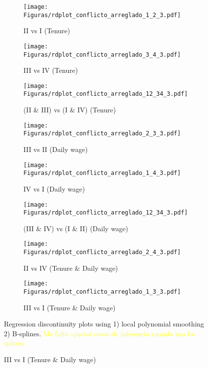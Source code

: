\documentclass[oneside,11pt]{article}
\begin{document}


\begin{figure}[H]
     \caption{RD plots (Calculator + letter treatment)}
    \label{rd_t3}
\begin{center}
\begin{subfigure}{0.31\textwidth}
\caption{II vs I (Tenure)}
        \texttt{[image: Figuras/rdplot\_conflicto\_arreglado\_1\_2\_3.pdf]}
    \end{subfigure}
    \begin{subfigure}{0.31\textwidth}
\caption{III vs IV (Tenure)}
        \texttt{[image: Figuras/rdplot\_conflicto\_arreglado\_3\_4\_3.pdf]}
    \end{subfigure}
\begin{subfigure}{0.31\textwidth}
\caption{(II \& III) vs (I \& IV)	(Tenure)}
        \texttt{[image: Figuras/rdplot\_conflicto\_arreglado\_12\_34\_3.pdf]}
    \end{subfigure}
    \begin{subfigure}{0.31\textwidth}
\caption{III vs II (Daily wage)}
        \texttt{[image: Figuras/rdplot\_conflicto\_arreglado\_2\_3\_3.pdf]}
    \end{subfigure}        
    \begin{subfigure}{0.31\textwidth}
\caption{IV vs I (Daily wage)}
        \texttt{[image: Figuras/rdplot\_conflicto\_arreglado\_1\_4\_3.pdf]}
    \end{subfigure}    
    \begin{subfigure}{0.31\textwidth}
\caption{(III \& IV) vs (I \& II) (Daily wage)}
        \texttt{[image: Figuras/rdplot\_conflicto\_arreglado\_12\_34\_3.pdf]}
    \end{subfigure}       
\begin{subfigure}{0.31\textwidth}
\caption{II vs IV (Tenure \& Daily wage)}
        \texttt{[image: Figuras/rdplot\_conflicto\_arreglado\_2\_4\_3.pdf]}
    \end{subfigure}
    \begin{subfigure}{0.31\textwidth}
\caption{III vs I (Tenure \& Daily wage)}
        \texttt{[image: Figuras/rdplot\_conflicto\_arreglado\_1\_3\_3.pdf]}
    \end{subfigure}        
  \end{center}
  
    \scriptsize Regression discontinuity plots using 1) local polynomial smoothing 2) B-splines. \textcolor{yellow}{Me falta ajustar cosas de inferencia cuando uso los splines.}
\end{figure}
\end{document}
